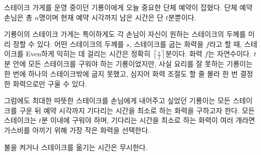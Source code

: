 스테이크 가게를 운영 중이던 기룡이에게 오늘 중요한 단체 예약이 잡혔다.
단체 예약 손님은 총 $n$명이며 현재 예약 시각까지 남은 시간은 단 $t$분뿐이다.

기룡이의 스테이크 가게는 특이하게도 각 손님이 자신이 원하는 스테이크의 두께를 미리 정할 수 있다.
어떤 스테이크의 두께를 $s$, 스테이크를 굽는 화력을 $f$라고 할 때, 스테이크를 Even하게 익히는 데 걸리는 시간은 정확히 $\left\lceil \frac{s}{f} \right\rceil$분이다. 화력 $f$는 자연수이다.
$t$분 안에 모든 스테이크를 구워야 하는 기룡이었지만, 사실 요리를 잘 못하는 기룡이는 한 번에 하나의 스테이크밖에 굽지 못했고, 심지어 화력 조절도 할 줄 몰라 한 번 결정한 화력으로만 구울 수 있다.

그럼에도 최대한 따뜻한 스테이크를 손님에게 내어주고 싶었던 기룡이는 모든 스테이크를 구운 뒤 예약 시각까지 기다리는 시간을 최소로 하는 화력을 구하고자 한다.
모든 스테이크는 $t$분 이내에 구워야 하며, 기다리는 시간을 최소로 하는 화력이 여러 개라면 가스비를 아끼기 위해 가장 작은 화력을 선택한다.

불을 켜거나 스테이크를 옮기는 시간은 무시한다.
